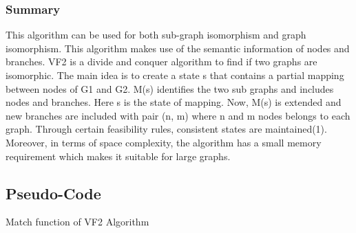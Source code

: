 \documentclass[11pt]{article}
\begin{document}
\subsubsection{Summary}
This algorithm can be used for both sub-graph isomorphism and graph isomorphism. This algorithm makes use of the semantic information of nodes and branches. VF2 is a divide and conquer algorithm to find if two graphs are isomorphic. The main idea is to create a state s that contains a partial mapping between nodes of G1 and G2. M(s) identifies the two sub graphs and includes nodes and branches. Here s is the state of mapping. Now, M(s) is extended and new branches are included with pair (n, m) where n and m nodes belongs to each graph. Through certain feasibility rules, consistent states are maintained(1). Moreover, in terms of space complexity, the algorithm has a small memory requirement which makes it suitable for large graphs.

\label{sect:pdf}
\subsection{Pseudo-Code}
\begin{algorithm}
  \DontPrintSemicolon
  \caption{Match function of VF2 Algorithm}
\end{algorithm}
\end{document}
